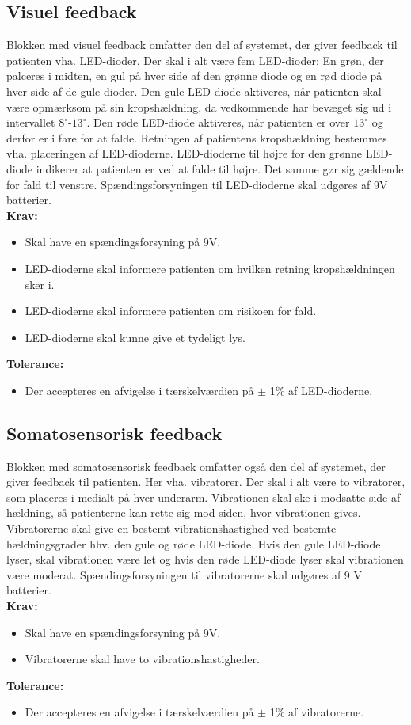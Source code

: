 \subsection{Visuel feedback}
Blokken med visuel feedback omfatter den del af systemet, der giver feedback til patienten vha. LED-dioder. Der skal i alt være fem LED-dioder: En grøn, der palceres i midten, en gul på hver side af den grønne diode og en rød diode på hver side af de gule dioder. Den gule LED-diode aktiveres, når patienten skal være opmærksom på sin kropshældning, da vedkommende har bevæget sig ud i intervallet $8^{\circ}$-$13^{\circ}$. Den røde LED-diode aktiveres, når patienten er over $13^{\circ}$ og derfor er i fare for at falde. Retningen af patientens kropshældning bestemmes vha. placeringen af LED-dioderne. LED-dioderne til højre for den grønne LED-diode indikerer at patienten er ved at falde til højre. Det samme gør sig gældende for fald til venstre. Spændingsforsyningen til LED-dioderne skal udgøres af 9V batterier.   
\\
\textbf{Krav:}
\begin{itemize}
\item Skal have en spændingsforsyning på 9V.
\item LED-dioderne skal informere patienten om hvilken retning kropshældningen sker i.
\item LED-dioderne skal informere patienten om risikoen for fald.
\item LED-dioderne skal kunne give et tydeligt lys.
\end{itemize}
\textbf{Tolerance:}
\begin{itemize}
\item Der accepteres en afvigelse i tærskelværdien på $\pm$ 1\% af LED-dioderne.
\end{itemize}
\subsection{Somatosensorisk feedback} 
Blokken med somatosensorisk feedback omfatter også den del af systemet, der giver feedback til patienten. Her vha. vibratorer. Der skal i alt være to vibratorer, som placeres i medialt på hver underarm. Vibrationen skal ske i modsatte side af hældning, så patienterne kan rette sig mod siden, hvor vibrationen gives. Vibratorerne skal give en bestemt vibrationshastighed ved bestemte hældningsgrader hhv. den gule og røde LED-diode. Hvis den gule LED-diode lyser, skal vibrationen være let og hvis den røde LED-diode lyser skal vibrationen være moderat. Spændingsforsyningen til vibratorerne skal udgøres af 9 V batterier.
\\
\textbf{Krav:}
\begin{itemize}
\item Skal have en spændingsforsyning på 9V.
\item Vibratorerne skal have to vibrationshastigheder.
\end{itemize}
\textbf{Tolerance:}
\begin{itemize}
\item Der accepteres en afvigelse i tærskelværdien på $\pm$ 1\% af vibratorerne.
\end{itemize}

